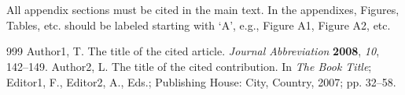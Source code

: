 \documentclass[jdss,article,submit,moreauthors,pdftex]{Definitions/jdss}
\begin{document}
\section{}
All appendix sections must be cited in the main text. In the appendixes, Figures, Tables, etc. should be labeled starting with `A', e.g., Figure A1, Figure A2, etc. 




%

\begin{thebibliography}{999}
Author1, T. The title of the cited article. {\em Journal Abbreviation} {\bf 2008}, {\em 10}, 142--149.
Author2, L. The title of the cited contribution. In {\em The Book Title}; Editor1, F., Editor2, A., Eds.; Publishing House: City, Country, 2007; pp. 32--58.
\end{thebibliography}


\end{document}
